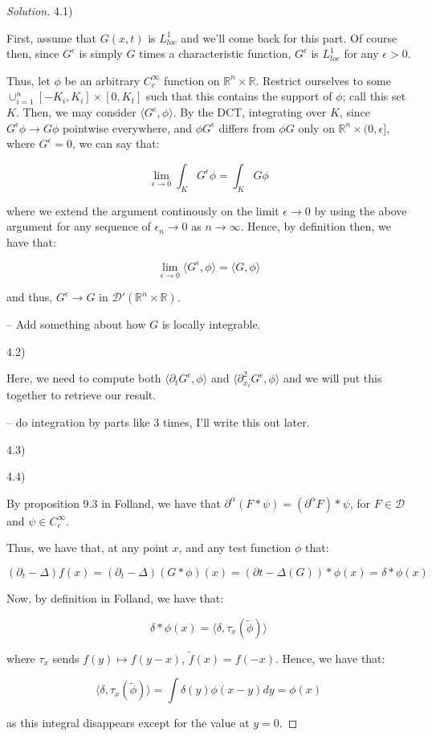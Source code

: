 \documentclass[10pt]{article}
\begin{document}
\begin{proof}[Solution]

4.1)

First, assume that $G(x,t)$ is $L^1_{loc}$ and we'll come back for this part. Of course then, since $G^\epsilon$ is simply $G$ times a characteristic function, $G^\epsilon$ is $L^1_{loc}$ for any $\epsilon > 0$.

Thus, let $\phi$ be an arbitrary $C^\infty_c$ function on $\mathbb{R}^n \times \mathbb{R}$. Restrict ourselves to some $\cup_{i=1}^n [-K_i, K_i] \times [0, K_t]$ such that this contains the support of $\phi$; call this set $K$. Then, we may consider $\langle G^\epsilon, \phi \rangle$. By the DCT, integrating over $K$, since $G^\epsilon \phi \to G \phi$ pointwise everywhere, and $\phi G^\epsilon$ differs from $\phi G$ only on $\mathbb{R}^n \times (0, \epsilon]$, where $G^\epsilon = 0$, we can say that:

$$ \lim_{\epsilon \to 0} \int_K G^\epsilon \phi = \int_K G \phi $$

where we extend the argument continously on the limit $\epsilon \to 0$ by using the above argument for any sequence of $\epsilon_n \to 0$ as $n \to \infty$. Hence, by definition then, we have that:

$$ \lim_{\epsilon \to 0} \langle G^\epsilon, \phi \rangle = \langle G, \phi \rangle $$

and thus, $G^\epsilon \to G$ in $\mathcal{D}'(\mathbb{R}^n \times \mathbb{R})$.

-- Add something about how $G$ is locally integrable.

4.2)

Here, we need to compute both $\langle \partial_t G^\epsilon, \phi \rangle$ and $\langle \partial_{x_i}^2 G^\epsilon, \phi \rangle$ and we will put this together to retrieve our result.

-- do integration by parts like 3 times, I'll write this out later.

4.3)

4.4)

By proposition 9.3 in Folland, we have that $\partial^\alpha(F \ast \psi) = (\partial^\alpha F) \ast \psi$, for $F \in \mathcal{D}$ and $\psi \in C^\infty_c$.

Thus, we have that, at any point $x$, and any test function $\phi$ that:

$$ ( \partial_t - \Delta)f(x) = (\partial_t - \Delta)(G \ast \phi)(x) = (\partial t - \Delta (G)) \ast \phi(x) = \delta \ast \phi(x)$$

Now, by definition in Folland, we have that:

$$ \delta \ast \phi(x) = \langle \delta, \tau_x(\tilde{\phi}) \rangle$$

where $\tau_x$ sends $f(y) \mapsto f(y - x)$, $\tilde{f}(x) = f(-x)$. Hence, we have that:

$$ \langle \delta, \tau_x(\tilde{\phi}) \rangle = \int \delta(y) \phi(x - y) dy = \phi(x) $$

as this integral disappears except for the value at $y = 0$.

\end{proof}
\end{document}
